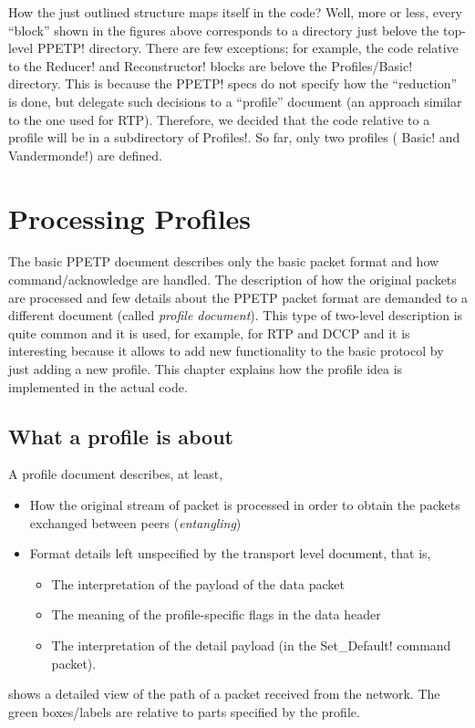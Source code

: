 \documentclass[a4paper]{medusabook}
\begin{document}
How the just outlined structure maps itself in the code?  Well, more
or less, every ``block'' shown in the figures above corresponds to a
directory just belove the top-level \ttt PPETP! directory.  There are few
exceptions; for example, the code relative to the \ttt Reducer!  and
\ttt Reconstructor! blocks are belove the \ttt Profiles/Basic!
directory.  This is because the \ttt PPETP! specs do not specify how
the ``reduction'' is done, but delegate such decisions to a
``profile'' document (an approach similar to the one used for RTP).
Therefore, we decided that the code relative to a profile will be
in a subdirectory of \ttt Profiles!.  So far, only two profiles (\ttt
Basic! and \ttt Vandermonde!) are defined.

\chapter{Processing Profiles}


The basic PPETP document describes only the basic packet format and
how command/acknowledge are handled.  The description of how the
original packets are processed and few details about the PPETP packet
format are demanded to a different document (called \emph{profile
  document}).  This type of two-level description is quite common and
it is used, for example, for RTP \cite{rfc3550} and DCCP
\cite{rfc4340} and it is interesting because it allows to add new
functionality to the basic protocol by just adding a new profile.
This chapter explains how the profile idea is implemented in the
actual code.

\section{What a profile is about}
\label{sect:0;overview}

A profile document describes, at least, 

\begin{itemize}
\item
How the original stream of packet is processed in order to obtain the
packets exchanged between peers  (\emph{entangling})
\item
Format details left unspecified by the transport level document, that
is,
\begin{itemize}
\item
The interpretation of the payload of the data packet
\item
The meaning of the profile-specific flags in the data header
\item
The interpretation of the detail payload (in the \ttt Set_Default!
command packet).
\end{itemize}
\end{itemize}
%
 shows a detailed view of the path of a packet received
from the network.  The green boxes/labels are relative to parts
specified by the profile.
\end{document}
